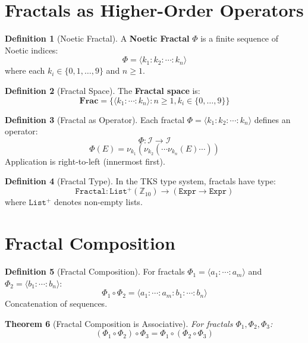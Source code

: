 \documentclass[11pt,twoside,openright]{book}
\theoremstyle{definition}
\newtheorem{definition}{Definition}[chapter]
\theoremstyle{plain}
\newtheorem{theorem}[definition]{Theorem}
\theoremstyle{remark}
\newcommand{\Ideas}{\mathcal{I}}
\newcommand{\noe}[1]{\nu_{#1}}
\newcommand{\Frac}{\Phi}
\newcommand{\FracSet}{\mathbf{Frac}}
\begin{document}
\section{Fractals as Higher-Order Operators}

\begin{definition}[Noetic Fractal]
\label{def:noetic-fractal}
A \textbf{Noetic Fractal} $\Frac$ is a finite sequence of Noetic indices:
\[
\Frac = \langle k_1 : k_2 : \cdots : k_n \rangle
\]
where each $k_i \in \{0, 1, \ldots, 9\}$ and $n \geq 1$.
\end{definition}

\begin{definition}[Fractal Space]
\label{def:fractal-space}
The \textbf{Fractal space} is:
\[
\FracSet = \{\langle k_1 : \cdots : k_n \rangle : n \geq 1, k_i \in \{0, \ldots, 9\}\}
\]
\end{definition}

\begin{definition}[Fractal as Operator]
\label{def:fractal-operator}
Each fractal $\Frac = \langle k_1 : k_2 : \cdots : k_n \rangle$ defines an operator:
\[
\Frac : \Ideas \to \Ideas
\]
\[
\Frac(E) = \noe{k_1}(\noe{k_2}(\cdots\noe{k_n}(E)\cdots))
\]
Application is right-to-left (innermost first).
\end{definition}

\begin{definition}[Fractal Type]
\label{def:fractal-type}
In the TKS type system, fractals have type:
\[
\mathtt{Fractal} : \mathtt{List}^+(\mathbb{Z}_{10}) \to (\mathtt{Expr} \to \mathtt{Expr})
\]
where $\mathtt{List}^+$ denotes non-empty lists.
\end{definition}

\section{Fractal Composition}

\begin{definition}[Fractal Composition]
\label{def:fractal-comp}
For fractals $\Frac_1 = \langle a_1 : \cdots : a_m \rangle$ and $\Frac_2 = \langle b_1 : \cdots : b_n \rangle$:
\[
\Frac_1 \circ \Frac_2 = \langle a_1 : \cdots : a_m : b_1 : \cdots : b_n \rangle
\]
Concatenation of sequences.
\end{definition}

\begin{theorem}[Fractal Composition is Associative]
\label{thm:fractal-assoc}
For fractals $\Frac_1, \Frac_2, \Frac_3$:
\[
(\Frac_1 \circ \Frac_2) \circ \Frac_3 = \Frac_1 \circ (\Frac_2 \circ \Frac_3)
\]
\end{theorem}
\end{document}
